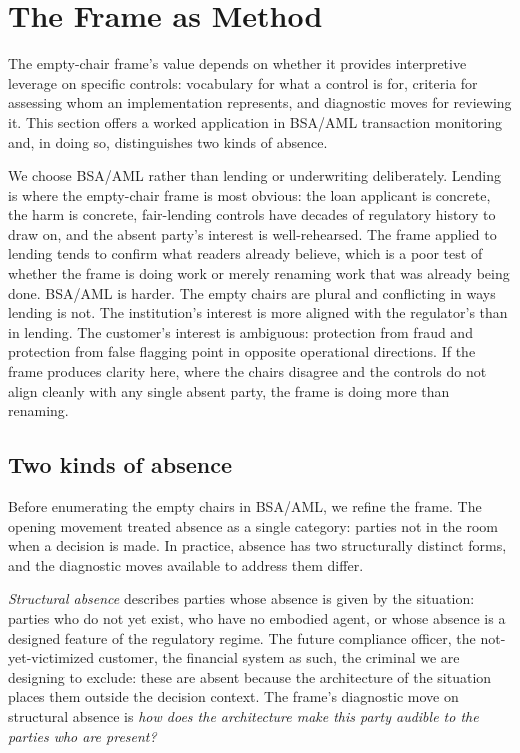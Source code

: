 
\section{The Frame as Method}
\label{sec:frame-as-method}

The empty-chair frame's value depends on whether it provides interpretive leverage on specific controls: vocabulary for what a control is for, criteria for assessing whom an implementation represents, and diagnostic moves for reviewing it. This section offers a worked application in BSA/AML transaction monitoring and, in doing so, distinguishes two kinds of absence.

We choose BSA/AML rather than lending or underwriting deliberately. Lending is where the empty-chair frame is most obvious: the loan applicant is concrete, the harm is concrete, fair-lending controls have decades of regulatory history to draw on, and the absent party's interest is well-rehearsed. The frame applied to lending tends to confirm what readers already believe, which is a poor test of whether the frame is doing work or merely renaming work that was already being done. BSA/AML is harder. The empty chairs are plural and conflicting in ways lending is not. The institution's interest is more aligned with the regulator's than in lending. The customer's interest is ambiguous: protection from fraud and protection from false flagging point in opposite operational directions. If the frame produces clarity here, where the chairs disagree and the controls do not align cleanly with any single absent party, the frame is doing more than renaming.

\subsection{Two kinds of absence}
\label{sec:frame-as-method:two-kinds-of-absence}

Before enumerating the empty chairs in BSA/AML, we refine the frame. The opening movement treated absence as a single category: parties not in the room when a decision is made. In practice, absence has two structurally distinct forms, and the diagnostic moves available to address them differ.

\emph{Structural absence} describes parties whose absence is given by the situation: parties who do not yet exist, who have no embodied agent, or whose absence is a designed feature of the regulatory regime. The future compliance officer, the not-yet-victimized customer, the financial system as such, the criminal we are designing to exclude: these are absent because the architecture of the situation places them outside the decision context. The frame's diagnostic move on structural absence is \emph{how does the architecture make this party audible to the parties who are present?}

